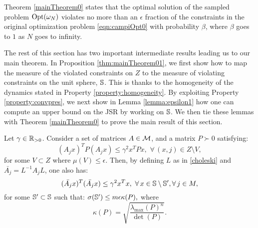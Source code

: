 Theorem \ref{mainTheorem0} states that the optimal solution of the sampled problem $\text{Opt}(\omega_N)$ violates no more than an $\epsilon$ fraction of the constraints in the original optimization problem  \eqref{eqn:campiOpt0} with probability $\beta$, where $\beta$ goes to $1$ as $N$ goes to infinity.

The rest of this section has two important intermediate results leading us to our main theorem.  
In Proposition \ref{thm:mainTheorem01}, we first show how to map the measure of the violated constraints on $Z$ to the measure of violating constraints on the unit sphere, $\mathbb{S}$. This is thanks to the homogeneity of the dynamics stated in Property \ref{property:homogeneity}. By exploiting Property \ref{property:convpres}, we next show in Lemma \ref{lemma:epsilon1} how one can compute an upper bound on the JSR by working on $\mathbb{S}$. We then tie these lemmas with Theorem \ref{mainTheorem0} to prove the main result of this section. 

\begin{proposition}\label{thm:mainTheorem01}Let $\gamma \in \mathbb{R}_{> 0}$. Consider a set of matrices $A \in \mathcal{M}$, and a matrix $P \succ 0$ satisfying:
\begin{equation}\label{eqn:P0}(A_j x)^TP(A_j x) \leq {\gamma}^2x^TPx,\,\, \forall\, (x, j) \in Z \setminus V,\end{equation}
for some $V \subset Z$ where $\mu(V) \leq \epsilon$. Then, by defining $L$ as in \eqref{choleski} and $\bar{A_j}=  L^{-1}A_jL$, one also has:
\begin{equation*}\label{eqn:thm01-2}(\bar{A_j} x)^T(\bar{A_j} x) \leq {\gamma}^2x^Tx,\,\, \forall\, x \in \mathbb{S} \setminus \mathbb{S}', \forall\, j \in M,\end{equation*}
for some $\mathbb{S}' \subset \mathbb{S}$ such that: $\sigma(\mathbb{S}') \leq m\epsilon \kappa(P),$
where $$\kappa(P) = \sqrt{\frac{\lambda_{\max}(P)^n}{\det(P)}}.$$
\end{proposition}

